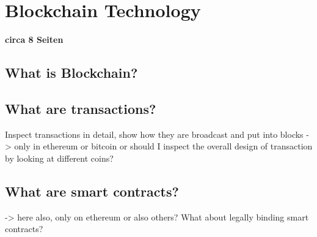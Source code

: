\chapter{Blockchain Technology}
\textbf{circa 8 Seiten}

\section{What is Blockchain?} \label{sec:Blockchain}

\section{What are transactions?} \label{sec:TX}

Inspect transactions in detail, show how they are broadcast and put into blocks
-> only in ethereum or bitcoin or should I inspect the overall design of transaction by looking at different coins?

\section{What are smart contracts?} \label{sec:SmartContracts}

-> here also, only on ethereum or also others? What about legally binding smart contracts?
